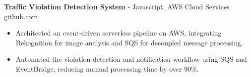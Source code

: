 \documentclass[11pt]{article}       %
\begin{document}

\textbf{Traffic Violation Detection System}{ - Javascript, AWS Cloud Services} \hfill \href{https://github.com/Monica20030707/AWS_rekonigition-N-read-database}{github.com} \\
\vspace{-9pt}
\begin{itemize}
  \item Architected an event-driven serverless pipeline on AWS, integrating Rekognition for image analysis and SQS for decoupled message processing.
  \item Automated the violation detection and notification workflow using SQS and EventBridge, reducing manual processing time by over 90\%.
\end{itemize}
\end{document}
